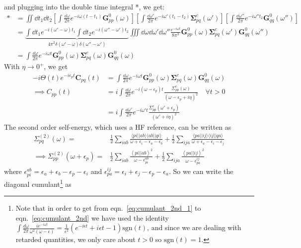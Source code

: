 and plugging into the double time integral *, we get:
\begin{align}
    * &= \iint \dd t_1 \dd t_2 \left[\int \frac{\dd \omega}{2\pi} e^{-i\omega (t-t_1)} \bm{G}_{pp}^{0}(\omega)\right] \left[\int \frac{\dd \omega'}{2\pi} e^{-i\omega' (t_1 - t_2)} \bm{\Sigma}_{pq}^c(\omega')\right] \left[\int \frac{\dd \omega''}{2\pi} e^{-i\omega'' t_2} \bm{G}_{qq}^{0}(\omega'')\right]\\
    &= \underbrace{\int \dd t_1 e^{-i \left(\omega' -\omega\right)t_1} \int \dd t_2 e^{-i \left(\omega'' -\omega'\right)t_2}}_{4\pi^2 \delta(\omega' -\omega)\delta(\omega'' -\omega')} \iiint \dd \omega \dd \omega' \dd \omega'' \frac{e^{-i\omega t}}{8\pi^3} \bm{G}_{pp}^{0}(\omega)\bm{\Sigma}_{pq}^c(\omega')\bm{G}_{qq}^{0}(\omega'')\\
    &= \int \frac{\dd \omega}{2\pi} e^{-i\omega t} \bm{G}_{pp}^{0}(\omega)\bm{\Sigma}_{pq}^c(\omega)\bm{G}_{qq}^{0}(\omega)
\end{align}
With $\eta \to 0^+$, we get
\begin{align}
    -i \Theta(t) e^{-i\epsilon_p t} \bm{C}_{pq}(t) &= \int \frac{\dd \omega}{2\pi} e^{-i\omega t} \bm{G}_{pp}^{0}(\omega)\bm{\Sigma}_{pq}^c(\omega)\bm{G}_{qq}^{0}(\omega) \\
\implies {C}_{pp}(t) &=  i\int \frac{\dd \omega}{2\pi} e^{-i(\omega - \epsilon_p) t} \frac{{\Sigma}_{pp}^c(\omega)}{(\omega - \epsilon_p + i\eta)^2} \quad \forall t>0\\ 
&=  i\int  \frac{\dd \omega'}{2\pi} e^{-i\omega' t} \frac{{\Sigma}_{pp}^c(\omega' + \epsilon_p)}{(\omega' + i\eta)^2} \label{eq:Cpp_0}
\end{align}
The second order self-energy, which uses a HF reference, can be written as
\begin{align}
\Sigma_{pq}^{(2)}(\omega) =& \frac{1}{2} \sum_{iab} \frac{\langle pi || ab \rangle \langle ab || qi \rangle}{\omega + \epsilon_i - \epsilon_a - \epsilon_b} + \frac{1}{2} \sum_{ija} \frac{\langle pa || ij \rangle \langle ij || qa \rangle}{\omega + \epsilon_a - \epsilon_i - \epsilon_j} \\
\implies \Sigma_{pp}^{(2)}(\omega+\epsilon_p) =&
\frac{1}{2} \sum_{iab}
\frac{\left< pi \left| \right| ab \right>^2}
{\omega-\epsilon_{pi}^{ab}} + \frac{1}{2} \sum_{ija}
\frac{\left< pa \left| \right| ij \right>^2}
{\omega-\epsilon_{pa}^{ij}}
\end{align}
where
$\epsilon_{pi}^{ab} = \epsilon_{a}+\epsilon_{b}-\epsilon_{p}-\epsilon_{i}$
and
$\epsilon_{pa}^{ij} = \epsilon_{i}+\epsilon_{j}-\epsilon_{p}-\epsilon_{a}$. So we can write the diagonal cumulant\footnote{ 
Note that in order to get from eqn.~\ref{eq:cumulant_2nd_1} to eqn.~\ref{eq:cumulant_2nd} we have used the identity $\int \frac{d\omega}{2\pi} \frac{i e^{-i \omega t}}{\omega^2\left(\omega-\epsilon\right)} = \frac{1}{\epsilon^2} \left(e^{-i \epsilon t} +i \epsilon t -1 \right) \mathrm{sgn}(t)$, and since we are dealing with retarded quantities, we only care about $t>0$ so $\mathrm{sgn}(t) = 1$.} as
